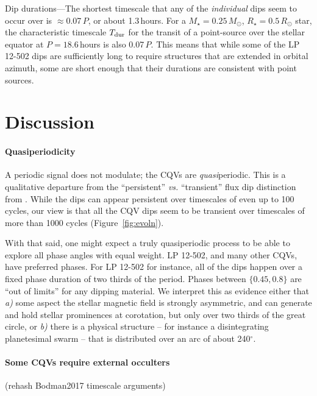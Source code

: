 \documentclass[11pt,twocolumn,tighten]{aastex63}
\begin{document}
{\sc Dip durations}---The shortest timescale that any of the {\it
individual} dips seem to occur over is $\approx$0.07\,$P$, or about
1.3\,hours.  For a $M_\star=0.25\,M_\odot$, $R_\star=0.5\,R_\odot$
star, the characteristic timescale $T_{\rm dur}$ for the transit of a
point-source over the stellar equator at $P=18.6\,$hours is also
0.07\,$P$.  This means that while some of the LP 12-502 dips are
sufficiently long to require structures that are extended in orbital
azimuth, some are short enough that their durations are consistent
with point sources.






\section{Discussion}
\label{sec:discussion}

\paragraph{Quasiperiodicity}
A periodic signal does not modulate; the CQVs are {\it quasi}periodic.
This is a qualitative departure from
the ``persistent'' {\it vs.} ``transient'' flux dip distinction from 
\citet{2017AJ....153..152S}.  While the dips can appear persistent
over timescales of even up to 100 cycles, our view is that all the CQV
dips seem to be transient over timescales of more than 1000 cycles
(Figure~\ref{fig:evoln}).

With that said, one might expect a truly quasiperiodic process to be
able to explore all phase angles with equal weight.  LP 12-502, and
many other CQVs, have preferred phases.  For LP 12-502 for instance,
all of the dips happen over a fixed phase duration of two thirds of
the period.  Phases between $\{0.45,0.8\}$ are ``out of limits'' for
any dipping material.  We interpret this as evidence
either that {\it a)} some aspect the stellar magnetic field is
strongly asymmetric, and can generate and hold stellar prominences at
corotation, but only over two thirds of the great circle,
or {\it b)} there is a physical structure -- for instance a
disintegrating planetesimal swarm -- that is distributed over an arc
of about 240$^\circ$.

\paragraph{Some CQVs require external occulters}
(rehash Bodman2017 timescale arguments)
\end{document}

